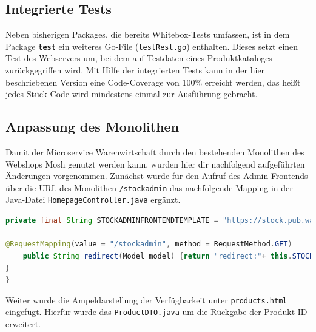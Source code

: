 \newpage
\subsection{Integrierte Tests}
\label{subsec: Integrierte Test}
Neben bisherigen Packages, die bereits Whitebox-Tests umfassen, ist in dem Package \textbf{\texttt{test}} ein weiteres Go-File (\texttt{testRest.go}) enthalten. Dieses setzt einen Test des Webservers um, bei dem auf Testdaten eines Produktkataloges zurückgegriffen wird. Mit Hilfe der integrierten Tests kann in der hier beschriebenen Version eine Code-Coverage von 100\% erreicht werden, das heißt jedes Stück Code wird mindestens einmal zur Ausführung gebracht.

\subsection{Anpassung des Monolithen}
\label{subsec: Anpassung des Monolithen}
Damit der Microservice Warenwirtschaft durch den bestehenden Monolithen des Webshops Mosh genutzt werden kann, wurden hier dir nachfolgend aufgeführten Änderungen vorgenommen. Zunächst wurde für den Aufruf des Admin-Frontends über die URL des Monolithen \texttt{/stockadmin} das nachfolgende Mapping in der Java-Datei \texttt{HomepageController.java} ergänzt.

\begin{lstlisting}[caption=Anpassung in HomepageController.java, language=Java]
private final String STOCKADMINFRONTENDTEMPLATE = "https://stock.pub.warehost.de/index.html";

@RequestMapping(value = "/stockadmin", method = RequestMethod.GET)
	public String redirect(Model model) {return "redirect:"+ this.STOCKADMINFRONTENDTEMPLATE;
}
}
\end{lstlisting}

Weiter wurde die Ampeldarstellung der Verfügbarkeit unter \texttt{products.html} eingefügt. Hierfür wurde das \texttt{ProductDTO.java} um die Rückgabe der Produkt-ID erweitert.

\begin{lstlisting}[caption=Anpassung products.html, language=HTML]


\end{lstlisting}



\begin{lstlisting}[caption=Anpassung ProductDTO.java, language=Java]
 
 
\end{lstlisting}


